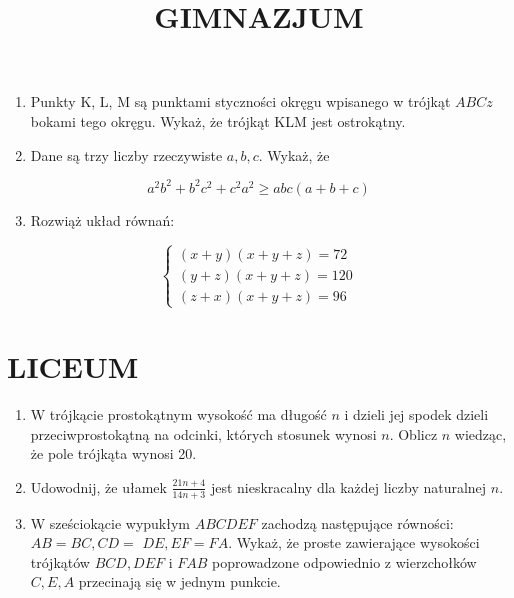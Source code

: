 \documentclass[10pt]{article}
\title{GIMNAZJUM }
\author{}
\date{}
\begin{document}
\maketitle
\begin{enumerate}
  \item Punkty K, L, M są punktami styczności okręgu wpisanego w trójkąt \(A B C z\) bokami tego okręgu. Wykaż, że trójkąt KLM jest ostrokątny.
  \item Dane są trzy liczby rzeczywiste \(a, b, c\). Wykaż, że
\end{enumerate}

\[
a^{2} b^{2}+b^{2} c^{2}+c^{2} a^{2} \geq a b c(a+b+c)
\]

\begin{enumerate}
  \setcounter{enumi}{2}
  \item Rozwiąż układ równań:
\end{enumerate}

\[
\left\{\begin{array}{c}
(x+y)(x+y+z)=72 \\
(y+z)(x+y+z)=120 \\
(z+x)(x+y+z)=96
\end{array}\right.
\]

\section*{LICEUM}
\begin{enumerate}
  \item W trójkącie prostokątnym wysokość ma długość \(n\) i dzieli jej spodek dzieli przeciwprostokątną na odcinki, których stosunek wynosi \(n\). Oblicz \(n\) wiedząc, że pole trójkąta wynosi 20.
  \item Udowodnij, że ułamek \(\frac{21 n+4}{14 n+3}\) jest nieskracalny dla każdej liczby naturalnej \(n\).
  \item W sześciokącie wypukłym \(A B C D E F\) zachodzą następujące równości: \(A B=B C, C D=\) \(D E, E F=F A\). Wykaż, że proste zawierające wysokości trójkątów \(B C D, D E F\) i \(F A B\) poprowadzone odpowiednio z wierzchołków \(C, E, A\) przecinają się w jednym punkcie.
\end{enumerate}
\end{document}
